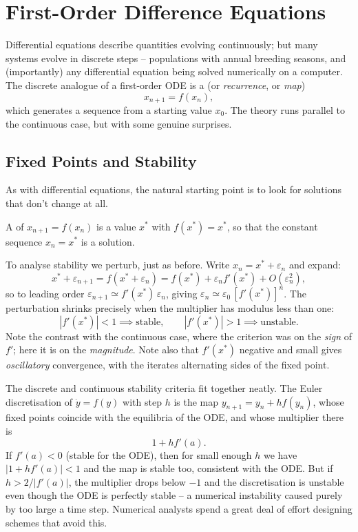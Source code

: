 \documentclass[a4paper]{scrartcl}
\begin{document}
\section{First-Order Difference Equations}

Differential equations describe quantities evolving continuously; but many systems evolve in discrete steps -- populations with annual breeding seasons, and (importantly) any differential equation being solved numerically on a computer. The discrete analogue of a first-order ODE is a  (or \emph{recurrence}, or \emph{map})
$$
x_{n + 1} = f(x_n),
$$
which generates a sequence from a starting value $x_0$. The theory runs parallel to the continuous case, but with some genuine surprises.

\subsection{Fixed Points and Stability}

As with differential equations, the natural starting point is to look for solutions that don't change at all.

\begin{definition}
	A  of $x_{n+1} = f(x_n)$ is a value $x^*$ with $f(x^*) = x^*$, so that the constant sequence $x_n = x^*$ is a solution.
\end{definition}

To analyse stability we perturb, just as before. Write $x_n = x^* + \varepsilon_n$ and expand:
$$
x^* + \varepsilon_{n + 1} = f(x^* + \varepsilon_n) = f(x^*) + \varepsilon_n f'(x^*) + O(\varepsilon_n^2),
$$
so to leading order $\varepsilon_{n+1} \simeq f'(x^*)\, \varepsilon_n$, giving $\varepsilon_n \simeq \varepsilon_0 \, [f'(x^*)]^n$. The perturbation shrinks precisely when the multiplier has modulus less than one:
$$
|f'(x^*)| < 1 \implies \text{stable}, \qquad |f'(x^*)| > 1 \implies \text{unstable}.
$$
Note the contrast with the continuous case, where the criterion was on the \emph{sign} of $f'$; here it is on the \emph{magnitude}. Note also that $f'(x^*)$ negative and small gives \emph{oscillatory} convergence, with the iterates alternating sides of the fixed point.

\begin{remark}
	The discrete and continuous stability criteria fit together neatly. The Euler discretisation of $\dot y = f(y)$ with step $h$ is the map $y_{n + 1} = y_n + h f(y_n)$, whose fixed points coincide with the equilibria of the ODE, and whose multiplier there is
	$$
	1 + h f'(a).
	$$
	If $f'(a) < 0$ (stable for the ODE), then for small enough $h$ we have $|1 + hf'(a)| < 1$ and the map is stable too, consistent with the ODE. But if $h > 2/|f'(a)|$, the multiplier drops below $-1$ and the discretisation is unstable even though the ODE is perfectly stable -- a numerical instability caused purely by too large a time step. Numerical analysts spend a great deal of effort designing schemes that avoid this.
\end{remark}
\end{document}
